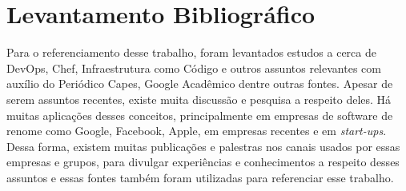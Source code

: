 \section{Levantamento Bibliográfico}

Para o referenciamento desse trabalho, foram levantados estudos a cerca de
\mbox{DevOps}, Chef, Infraestrutura como Código e outros assuntos relevantes com
auxílio do Periódico Capes, Google Acadêmico dentre outras fontes.
Apesar de serem assuntos recentes, existe muita discussão e pesquisa a
respeito deles. Há muitas aplicações desses conceitos, principalmente
em empresas de software de renome como Google, Facebook, Apple, em
empresas recentes e em \textit{start-ups}. Dessa forma, existem muitas publicações e %
palestras nos canais usados por essas empresas e grupos, para divulgar
experiências e conhecimentos a respeito desses assuntos e essas fontes
também foram utilizadas para referenciar esse trabalho.



